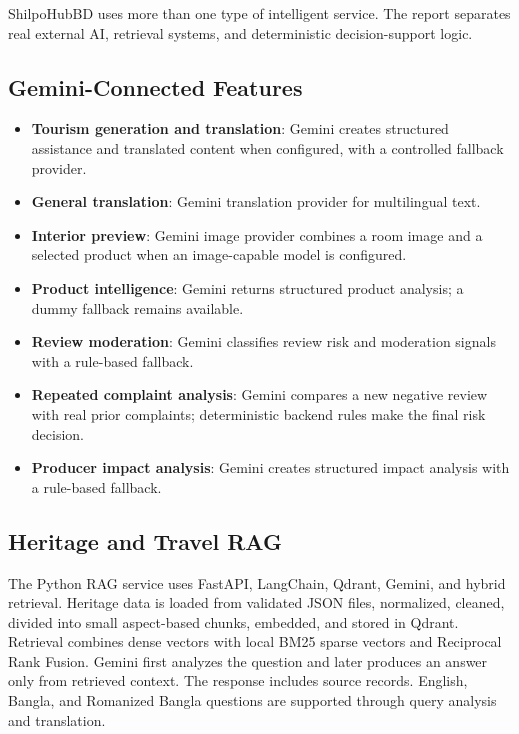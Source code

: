 \documentclass[12pt,a4paper]{report}
\begin{document}
ShilpoHubBD uses more than one type of intelligent service. The report separates real external AI, retrieval systems, and deterministic decision-support logic.

\subsection{Gemini-Connected Features}

\begin{itemize}
  \item \textbf{Tourism generation and translation}: Gemini creates structured assistance and translated content when configured, with a controlled fallback provider.
  \item \textbf{General translation}: Gemini translation provider for multilingual text.
  \item \textbf{Interior preview}: Gemini image provider combines a room image and a selected product when an image-capable model is configured.
  \item \textbf{Product intelligence}: Gemini returns structured product analysis; a dummy fallback remains available.
  \item \textbf{Review moderation}: Gemini classifies review risk and moderation signals with a rule-based fallback.
  \item \textbf{Repeated complaint analysis}: Gemini compares a new negative review with real prior complaints; deterministic backend rules make the final risk decision.
  \item \textbf{Producer impact analysis}: Gemini creates structured impact analysis with a rule-based fallback.
\end{itemize}

\subsection{Heritage and Travel RAG}

The Python RAG service uses FastAPI, LangChain, Qdrant, Gemini, and hybrid retrieval. Heritage data is loaded from validated JSON files, normalized, cleaned, divided into small aspect-based chunks, embedded, and stored in Qdrant. Retrieval combines dense vectors with local BM25 sparse vectors and Reciprocal Rank Fusion. Gemini first analyzes the question and later produces an answer only from retrieved context. The response includes source records. English, Bangla, and Romanized Bangla questions are supported through query analysis and translation.
\end{document}
